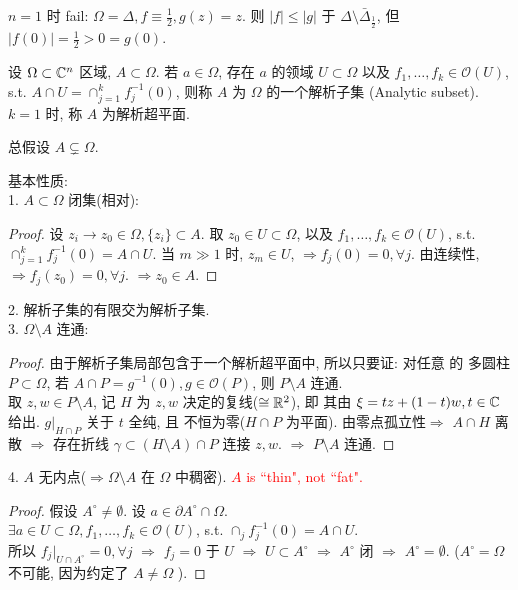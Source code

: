 \begin{remark}
  $n=1$ 时 fail:
   $\Omega =\Delta ,f \equiv \frac{1}{2},g(z)=z$. 则 $|f| \leq |g|$ 于 $\Delta \setminus \bar{\Delta }_{\frac{1}{2}}$, 但 $|f(0)|=\frac{1}{2}>0=g(0)$.     
\end{remark}



\begin{definition}
  设 $\Omega \subset {\mathbb C}^n$ 区域, $A \subset \Omega $. 若 $a \in \Omega $,  存在 $a$  的领域 $U \subset \Omega $ 以及 $f_1,\dots,f_k \in \mathcal{O}(U)$, s.t. $A \cap U=\cap _{j=1}^{k} f_{j}^{-1}(0)$, 则称 $A$  为 $\Omega $ 的一个{\sffamily\small 解析子集} (Analytic subset). 
  $k=1$ 时, 称 $A$ 为解析超平面.         
\end{definition}
\begin{remark}
  总假设 $A \subsetneq  \Omega $. 
\end{remark}

基本性质: \\
1. $A \subset \Omega $ 闭集(相对):
\begin{proof}
  设 $z_i \to z_0 \in \Omega, \{z_i\} \subset A $.  取 $z_0 \in U \subset \Omega $, 以及 $f_1,\dots,f_k \in \mathcal{O}(U)$, s.t. $\cap_{j=1}^{k} f_{j}^{-1}(0)=A \cap U$.  
  当 $m \gg 1$ 时, $z_m \in U$, $\Rightarrow f_j(0)=0, \forall j$.
  由连续性, $\Rightarrow f_j(z_0)=0, \forall j$. $\Rightarrow z_0 \in A$.     
\end{proof}
 2. 解析子集的有限交为解析子集.\\
 3. $\Omega \setminus A$ 连通: 
 \begin{proof}
  由于解析子集局部包含于一个解析超平面中, 所以只要证: 对任意 的 多圆柱 $P \subset \Omega $, 若 $A \cap P=g^{-1}(0), g \in \mathcal{O}(P)$, 则 $P \setminus A$ 连通.  \\
  取 $z,w \in P \setminus A$, 记 $H$ 为 $z,w$ 决定的复线($\cong {\mathbb R}^2$), 即 其由 $\xi =tz+(1-t)w,t \in {\mathbb C}$ 给出. $g|_{H \cap P}$ 关于 $t$ 全纯, 且 不恒为零($H \cap P$ 为平面). 由零点孤立性$\Rightarrow $ $A \cap H$ 离散 $\Rightarrow $ 存在折线 $\gamma \subset (H \setminus A) \cap P$ 连接 $z,w$. $\Rightarrow $ $P \setminus A$ 连通.             
 \end{proof}
4. $A$ 无内点($\Rightarrow \Omega \setminus A$ 在 $\Omega $ 中稠密). \textcolor{red}{$A$ is ``thin", not ``fat".  } 
\begin{proof}
  假设 $A^{\circ } \neq \emptyset  $. 
  设 $a \in \partial A^{\circ } \cap \Omega $.\\
   $\exists a \in U \subset \Omega , f_1,\dots,f_k \in \mathcal{O}(U)$, s.t. $\cap_{j} f_{j}^{-1}(0)=A \cap U$. \\
  所以 $f_j |_{U \cap A^{\circ }}=0, \forall j$
   $\Rightarrow $ $f_j=0$ 于 $U$   
   $\Rightarrow $ $U \subset A^{\circ }$ $\Rightarrow $ $A^{\circ }$ 闭 $\Rightarrow $ $A^{\circ }=\emptyset $. ($A^{\circ }=\Omega $不可能, 因为约定了 $A \neq \Omega $  ).       
\end{proof}

